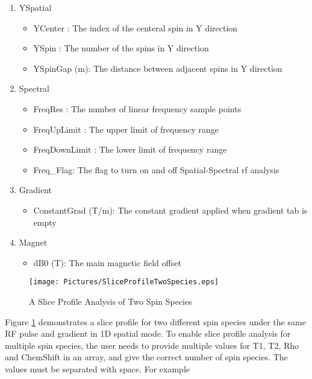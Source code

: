 \documentclass{book}%
\begin{document}
\begin{enumerate}
\begin{enumerate}
\item YSpatial \label{it:YSpatial}

\begin{itemize}
	\item YCenter : The index of the centeral spin in Y direction
	\item YSpin : The number of the spins in Y direction
	\item YSpinGap (m): The distance between adjacent spins in Y direction
\end{itemize}

\item Spectral \label{it:Spectral}

\begin{itemize}
	\item FreqRes : The number of linear frequency sample points
	\item FreqUpLimit : The upper limit of frequency range
	\item FreqDownLimit : The lower limit of frequency range
	\item Freq\_Flag: The flag to turn on and off Spatial-Spectral rf analysis
\end{itemize}

\item Gradient

\begin{itemize}
	\item ConstantGrad (T/m): The constant gradient applied when gradient tab is empty
\end{itemize}

\item Magnet

\begin{itemize}
	\item dB0 (T): The main magnetic field offset
\end{itemize}

\end{enumerate}

\begin{figure}[htbp]
	\centering
		\texttt{[image: Pictures/SliceProfileTwoSpecies.eps]}
	\caption{A Slice Profile Analysis of Two Spin Species}
	\label{fig:SliceProfileTwoSpecies}
\end{figure}

Figure \ref{fig:SliceProfileTwoSpecies} demonstrates a slice profile for two different spin species under the same RF pulse and gradient in 1D spatial mode. To enable slice profile analysis for multiple spin species, the user needs to provide multiple values for T1, T2, Rho and ChemShift in an array, and give the correct number of spin species. The values must be separated with space. For example


\end{enumerate}
\end{document}
